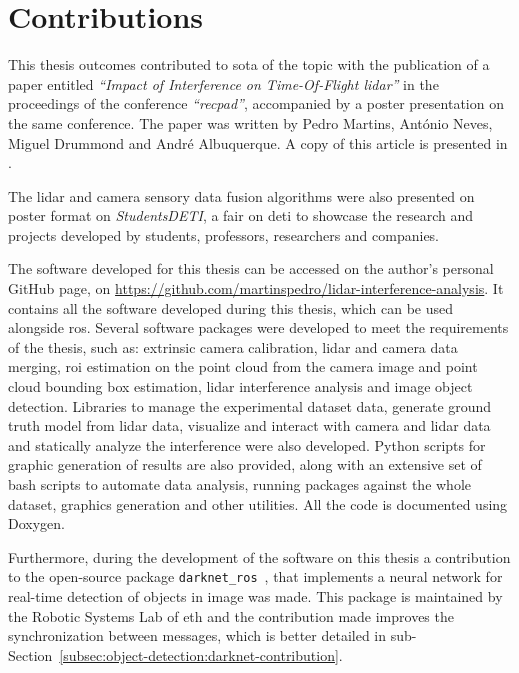 \section{Contributions} 
\label{section:introduction:contributions}
This thesis outcomes contributed to \acl{sota} of the topic with the publication of a paper entitled \textit{``Impact of Interference on Time-Of-Flight \acs{lidar}''} in the proceedings of the conference \textit{``\acl{recpad}''}, accompanied by a poster presentation on the same conference. The paper was written by Pedro Martins, António Neves, Miguel Drummond and André Albuquerque. A copy of this article is presented in .

The \ac{lidar} and camera sensory data fusion algorithms were also presented on poster format on \textit{Students\@ DETI}, a fair on \acl{deti} to showcase the research and projects developed by students, professors, researchers and companies.

The software developed for this thesis can be accessed on the author's personal GitHub page, on \url{https://github.com/martinspedro/lidar-interference-analysis}. It contains all the software developed during this thesis, which can be used alongside \acf{ros}. Several software packages were developed to meet the requirements of the thesis, such as: extrinsic camera calibration, \ac{lidar} and camera data merging, \ac{roi} estimation on the point cloud from the camera image and point cloud bounding box estimation, \ac{lidar} interference analysis and image object detection. Libraries to manage the experimental dataset data, generate ground truth model from \ac{lidar} data, visualize and interact with camera and \ac{lidar} data and statically analyze the interference were also developed. Python scripts for graphic generation of results are also provided, along with an extensive set of bash scripts to automate data analysis, running packages against the whole dataset, graphics generation and other utilities. All the code is documented using Doxygen.

Furthermore, during the development of the software on this thesis a contribution to the open-source package \texttt{darknet\_ros}~\cite{MarkoBjelonic}, that implements a neural network for real-time detection of objects in image was made. This package is maintained by the Robotic Systems Lab of \acl{eth} and the contribution made improves the synchronization between messages, which is better detailed in sub-Section~\ref{subsec:object-detection:darknet-contribution}.

